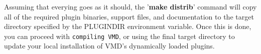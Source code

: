  Assuming that everying goes as it should, the '{\bf make distrib}'  command will copy all of the required plugin binaries, support files, and  documentation to the target directory specified by the PLUGINDIR environment variable. Once this is done, you can proceed with  {\tt compiling VMD},  or using the final target directory to update your local installation of VMD's dynamically loaded plugins.

